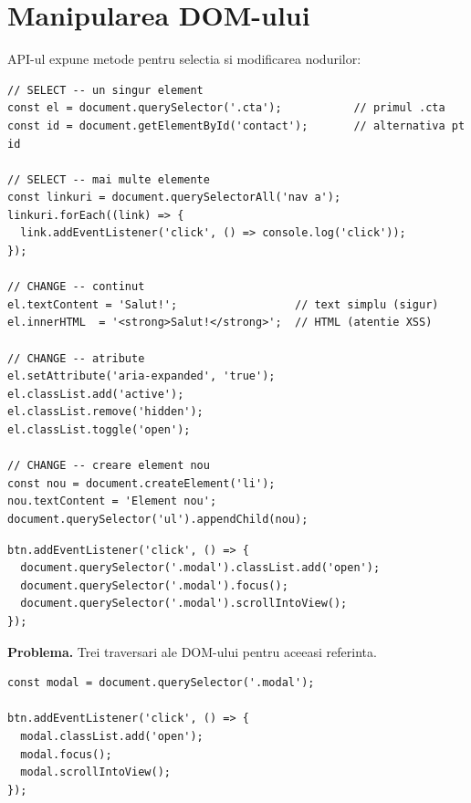 \section{Manipularea DOM-ului}

API-ul  expune metode pentru selectia si modificarea nodurilor:

\begin{lstlisting}[style=js, caption={Operatii uzuale}]
// SELECT -- un singur element
const el = document.querySelector('.cta');           // primul .cta
const id = document.getElementById('contact');       // alternativa pt id

// SELECT -- mai multe elemente
const linkuri = document.querySelectorAll('nav a');
linkuri.forEach((link) => {
  link.addEventListener('click', () => console.log('click'));
});

// CHANGE -- continut
el.textContent = 'Salut!';                  // text simplu (sigur)
el.innerHTML  = '<strong>Salut!</strong>';  // HTML (atentie XSS)

// CHANGE -- atribute
el.setAttribute('aria-expanded', 'true');
el.classList.add('active');
el.classList.remove('hidden');
el.classList.toggle('open');

// CHANGE -- creare element nou
const nou = document.createElement('li');
nou.textContent = 'Element nou';
document.querySelector('ul').appendChild(nou);
\end{lstlisting}

\begin{dano}
\begin{lstlisting}[style=js, numbers=none]
btn.addEventListener('click', () => {
  document.querySelector('.modal').classList.add('open');
  document.querySelector('.modal').focus();
  document.querySelector('.modal').scrollIntoView();
});
\end{lstlisting}
\textbf{Problema.} Trei traversari ale DOM-ului pentru aceeasi referinta.
\end{dano}

\begin{dado}
\begin{lstlisting}[style=js, numbers=none]
const modal = document.querySelector('.modal');

btn.addEventListener('click', () => {
  modal.classList.add('open');
  modal.focus();
  modal.scrollIntoView();
});
\end{lstlisting}
\end{dado}

